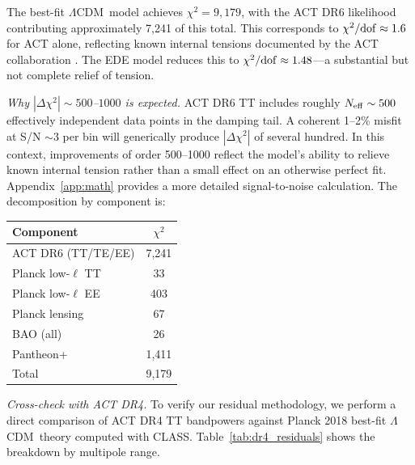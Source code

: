 \documentclass[onecolumn,showpacs,preprintnumbers,amsmath,amssymb,prd]{revtex4-2}
\newcommand{\lcdm}{$\Lambda$CDM}
\begin{document}
The best-fit \lcdm\ model achieves $\chi^2 = 9{,}179$, with the ACT DR6 
likelihood contributing approximately 7,241 of this total. This corresponds 
to $\chi^2/{\rm dof} \approx 1.6$ for ACT alone, reflecting known internal 
tensions documented by the ACT collaboration \cite{ACT2024}. The EDE model 
reduces this to $\chi^2/{\rm dof} \approx 1.48$---a substantial but not 
complete relief of tension.

\emph{Why $|\Delta\chi^2| \sim 500$--$1000$ is expected.} ACT DR6 TT includes 
roughly $N_{\rm eff} \sim 500$ effectively independent data points in the 
damping tail. A coherent 1--2\% misfit at S/N $\sim 3$ per bin will generically 
produce $|\Delta\chi^2|$ of several hundred. In this context, improvements of 
order 500--1000 reflect the model's ability to relieve known internal tension 
rather than a small effect on an otherwise perfect fit. Appendix~\ref{app:math} 
provides a more detailed signal-to-noise calculation. The decomposition by 
component is:
\begin{center}
\begin{tabular}{lc}
\toprule
Component & $\chi^2$ \\
\midrule
ACT DR6 (TT/TE/EE) & 7,241 \\
Planck low-$\ell$ TT & 33 \\
Planck low-$\ell$ EE & 403 \\
Planck lensing & 67 \\
BAO (all) & 26 \\
Pantheon+ & 1,411 \\
\midrule
Total & 9,179 \\
\bottomrule
\end{tabular}
\end{center}

\emph{Cross-check with ACT DR4.} To verify our residual methodology, 
we perform a direct comparison of ACT DR4 TT bandpowers against 
Planck 2018 best-fit \lcdm\ theory computed with \textsc{CLASS}. 
Table~\ref{tab:dr4_residuals} shows the breakdown by multipole range.
\end{document}
